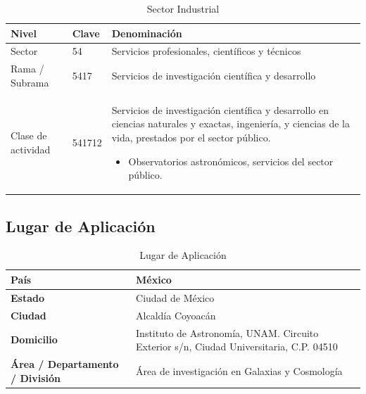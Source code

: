 \documentclass[12pt]{article}
\begin{document}
\begin{table}[H]
\centering
\small
\begin{tabular}{|p{}|p{}|p{}|}
\hline
\textbf{Nivel} & \textbf{Clave} & \textbf{Denominación} \\ \hline

Sector &
54 &
Servicios profesionales, científicos y técnicos \\ \hline

Rama / Subrama &
5417 &
Servicios de investigación científica y desarrollo \\ \hline

Clase de actividad &
541712 &
Servicios de investigación científica y desarrollo en ciencias naturales y exactas, ingeniería, y ciencias de la vida, prestados por el sector público.

\begin{itemize}
    \item Observatorios astronómicos, servicios del sector público.
\end{itemize}
\\ \hline

\end{tabular}
\caption{Sector Industrial}
\label{sector-industrial}
\end{table}

\subsection{Lugar de Aplicación}

\begin{table}[H]
\centering
\small
\begin{tabular}{|p{}|p{}|}
\hline

\textbf{País} &
México \\ \hline

\textbf{Estado} &
Ciudad de México \\ \hline

\textbf{Ciudad} &
Alcaldía Coyoacán \\ \hline

\textbf{Domicilio} &
Instituto de Astronomía, UNAM. Circuito Exterior s/n, Ciudad Universitaria, C.P. 04510 \\ \hline

\textbf{Área / Departamento / División} &
Área de investigación en Galaxias y Cosmología \\ \hline

\end{tabular}
\caption{Lugar de Aplicación}
\label{aplicacion}
\end{table}
\end{document}
